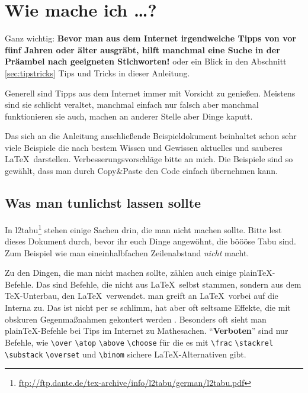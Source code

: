 \section{Wie mache ich \dots ?}
Ganz wichtig: \textbf{Bevor man aus dem Internet irgendwelche Tipps von vor fünf Jahren oder älter ausgräbt, hilft manchmal eine Suche in der Präambel nach geeigneten Stichworten!} oder ein Blick in den Abschnitt \ref{sec:tipstricks} Tips und Tricks in dieser Anleitung.

Generell sind Tipps aus dem Internet immer mit Vorsicht zu genießen. Meistens sind sie schlicht veraltet, manchmal einfach nur falsch aber manchmal funktionieren sie auch, machen an anderer Stelle aber Dinge kaputt.

Das sich an die Anleitung anschließende Beispieldokument beinhaltet schon sehr viele Beispiele die nach bestem Wissen und Gewissen aktuelles und sauberes \LaTeX\ darstellen. Verbesserungsvorschläge bitte an mich. Die Beispiele sind so gewählt, dass man durch Copy\&Paste den Code einfach übernehmen kann.

\subsection{Was man tunlichst lassen sollte}
In l2tabu\footnote{\url{ftp://ftp.dante.de/tex-archive/info/l2tabu/german/l2tabu.pdf}} stehen einige Sachen drin, die man nicht machen sollte. Bitte lest dieses Dokument durch, bevor ihr euch Dinge angewöhnt, die böööse Tabu sind. Zum Beispiel wie man eineinhalbfachen Zeilenabstand \emph{nicht} macht.

Zu den Dingen, die man nicht machen sollte, zählen auch einige plain\TeX-Befehle. Das sind Befehle, die nicht aus \LaTeX\ selbst stammen, sondern aus dem \TeX-Unterbau, den \LaTeX\ verwendet. \Dhe man greift an \LaTeX\ vorbei auf die Interna zu. Das ist nicht per se schlimm, hat aber oft seltsame Effekte, die mit obskuren Gegenmaßnahmen gekontert werden \usw.  Besonders oft sieht man plain\TeX-Befehle bei Tips im Internet zu Mathesachen.  \enquote{\textbf{Verboten}} sind nur Befehle, wie \verb+\over+ \verb+\atop+ \verb+\above+ \verb+\choose+ für die es mit \verb+\frac+ \verb+\stackrel+ \verb+\substack+ \verb+\overset+ und \verb+\binom+ sichere \LaTeX-Alternativen gibt.

